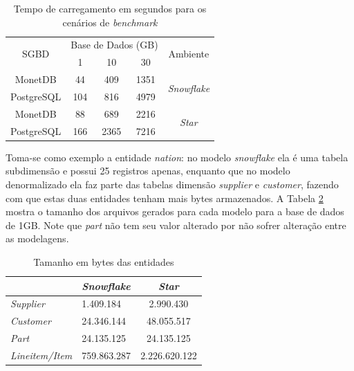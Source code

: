 \begin{table}[htpb]
        \centering
        \caption{Tempo de carregamento em segundos para os cenários de \textit{benchmark}}
        \label{tab:carregamento}
        \begin{tabular}{c|ccc|c}
        \hline
        \multirow{2}{*}{SGBD} & \multicolumn{3}{c|}{Base de Dados (GB)} & \multirow{2}{*}{Ambiente}  \\
                              & 1           & 10          & 30          &                            \\ \hline
        MonetDB               & 44          & 409         & 1351        & \multirow{2}{*}{\textit{Snowflake}} \\
        PostgreSQL            & 104         & 816         & 4979        &                            \\ \hline
        MonetDB               & 88          & 689         & 2216        & \multirow{2}{*}{\textit{Star}}      \\
        PostgreSQL            & 166         & 2365        & 7216        &                            \\ \hline
        \end{tabular}
    \end{table}

Toma-se como exemplo a entidade \textit{nation}: no modelo \textit{snowflake} ela é uma tabela subdimensão e possui 25 registros apenas, enquanto que no modelo denormalizado ela faz parte das tabelas dimensão \textit{supplier} e \textit{customer}, fazendo com que estas duas entidades tenham mais bytes armazenados. A Tabela \ref{tab:tamanho} mostra o tamanho dos arquivos gerados para cada modelo para a base de dados de 1GB. Note que \textit{part} não tem seu valor alterado por não sofrer alteração entre as modelagens.

\begin{table}[htpb]
        \centering
        \caption{Tamanho em bytes das entidades}
        \label{tab:tamanho}
        \begin{tabular}{l|l|c|}
        \cline{2-3}
                                                     & \textit{Snowflake} & \textit{Star} \\ \hline
        \multicolumn{1}{|l|}{\textit{Supplier}}      & 1.409.184          & 2.990.430     \\ \hline
        \multicolumn{1}{|l|}{\textit{Customer}}      & 24.346.144         & 48.055.517    \\ \hline
        \multicolumn{1}{|l|}{\textit{Part}}          & 24.135.125         & 24.135.125    \\ \hline
        \multicolumn{1}{|l|}{\textit{Lineitem/Item}} & 759.863.287        & 2.226.620.122 \\ \hline
        \end{tabular}
        \end{table}


